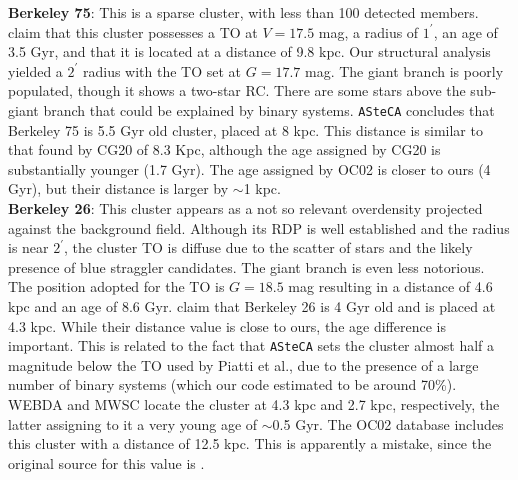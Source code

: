 \documentclass{aa}
\begin{document}
\begin{appendix}
  \noindent \textbf{Berkeley 75}: This is a sparse cluster, with less than 100
  detected members. \cite{Carraro_2005} claim that this cluster possesses
  a TO at $V= 17.5$ mag, a radius of $1^{\prime}$, an age of 3.5 Gyr, and that it is
  located at a distance of 9.8 kpc.
  Our structural analysis yielded a $2^{\prime}$ radius with the TO set at
  $G=17.7$ mag. The giant branch is poorly populated, though it shows a two-star
  RC. There are some stars above the sub-giant branch that could be explained
  by binary systems. \texttt{ASteCA} concludes that Berkeley 75 is 5.5 Gyr old
  cluster, placed at 8 kpc. This distance is similar to that found by CG20
  of 8.3 Kpc, although the age assigned by CG20 is substantially younger (1.7
  Gyr). The age assigned by OC02 is closer to ours (4 Gyr), but their distance is
  larger by $\sim$1 kpc.\\

  \noindent \textbf{Berkeley 26}: This cluster appears as a not so relevant overdensity
  projected against the background field. Although its RDP is well established
  and the radius is near $2^{\prime}$, the cluster TO is diffuse due to the
  scatter of stars and the likely presence of  blue straggler candidates. The
  giant branch is even less notorious.
  The position adopted for the TO is $G=18.5$ mag resulting in a distance of 4.6
  kpc and an age of 8.6 Gyr. \cite{Piatti_2010} claim that Berkeley 26 is 4 Gyr
  old and is placed at 4.3 kpc. While their distance value is close to ours, the
  age difference is important. This is related to the fact that \texttt{ASteCA}
  sets the cluster almost half a magnitude below the TO used by Piatti et al.,
  due to the presence of a large number of binary systems (which our code
  estimated to be around 70\%).
  WEBDA and MWSC locate the cluster at 4.3 kpc and 2.7 kpc, respectively, the
  latter assigning to it a very young age of $\sim$0.5 Gyr. The OC02 database
  includes this cluster with a distance of 12.5 kpc. This is apparently
  a mistake, since the original source for this value is \cite{Piatti_2010}.\\


\end{appendix}
\end{document}
